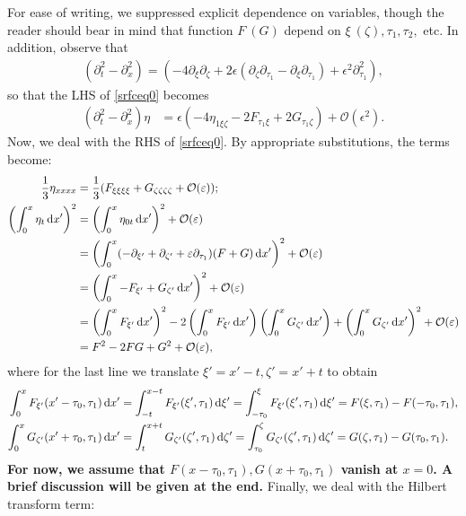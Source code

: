 \documentclass[10pt,reqno,oneside,a4paper, landscape]{article}
\begin{document}
For ease of writing, we suppressed explicit dependence on variables, though the reader should bear in mind that function $F ~ (G)$ depend on $\xi ~ (\zeta), \tau_1, \tau_2,$ etc. In addition, observe that
\begin{align*}
(\partial_t^2 - \partial_x^2) = \left( - 4\partial_\xi \partial_\zeta + 2\epsilon(\partial_\zeta \partial_{\tau_1} - \partial_\xi\partial_{\tau_1}) + \epsilon^2 \partial_{\tau_1}^2 \right),
\end{align*}
so that the LHS of \eqref{srfceq0} becomes
\begin{align}
(\partial_t^2 - \partial_x^2) \eta &= \epsilon \left(- 4\eta_{1\xi \zeta} - 2F_{\tau_1 \xi} + 2G_{\tau_1 \zeta} \right) + \mathcal{O}(\epsilon^2). \label{LHS1}
\end{align}
Now, we deal with the RHS of \eqref{srfceq0}. By appropriate substitutions, the terms become:
\begin{align*}
\frac{1}{3}\eta_{xxxx} &= \frac{1}{3}(F_{\xi\xi\xi\xi} + G_{\zeta\zeta\zeta\zeta} + \mathcal{O}(\varepsilon)); \\
\left( \int^{x}_{0} \eta_t \,\mathrm{d} x' \right)^2 &= \left( \int^{x}_{0} \eta_{0t} \,\mathrm{d} x' \right)^2 + \mathcal{O}(\varepsilon) \\
&= \left( \int^{x}_{0}(-\partial_{\xi'} + \partial_{\zeta'} + \varepsilon \partial_{\tau_1}) (F+G) \,\mathrm{d} x' \right)^2 + \mathcal{O}(\varepsilon)\\ 
&= \left( \int^{x}_{0}-F_{\xi'} + G_{\zeta'} \,\mathrm{d} x' \right)^2 + \mathcal{O}(\varepsilon)\\
&= \left( \int^{x}_{0}F_{\xi'} \,\mathrm{d} x'\right)^2 - 2\left( \int^{x}_{0}F_{\xi'} \,\mathrm{d} x'\right)\left( \int^{x}_{0}G_{\zeta'} \,\mathrm{d} x'\right) + \left( \int^{x}_{0} G_{\zeta'} \,\mathrm{d} x'\right)^2 + \mathcal{O}(\varepsilon) \\
&= F^2 - 2FG + G^2 + \mathcal{O}(\varepsilon),
\end{align*}
where for the last line we translate $\xi' = x'-t, \zeta' = x'+t$ to obtain
\begin{align*}
\int^{x}_{0}F_{\xi'}(x' - \tau_0, \tau_1) \,\mathrm{d} x' &=  \int^{x-t}_{-t}F_{\xi'}(\xi', \tau_1) \,\mathrm{d} \xi' =\int^{\xi}_{-\tau_0}F_{\xi'}(\xi', \tau_1) \,\mathrm{d} \xi' = F(\xi, \tau_1) - F(-\tau_0, \tau_1), \\
\int^{x}_{0} G_{\zeta'}(x'+\tau_0, \tau_1) \,\mathrm{d} x' &=  \int^{x+t}_{t}G_{\zeta'}(\zeta', \tau_1) \,\mathrm{d} \zeta' = \int^{\zeta}_{\tau_0}G_{\zeta'}(\zeta', \tau_1) \,\mathrm{d} \zeta' = G(\zeta, \tau_1) - G(\tau_0, \tau_1).
\end{align*}
\textbf{For now, we assume that $F(x-\tau_0, \tau_1), G(x+\tau_0, \tau_1)$ vanish at $x = 0$. A brief discussion will be given at the end.} Finally, we deal with the Hilbert transform term: 
\end{document}
